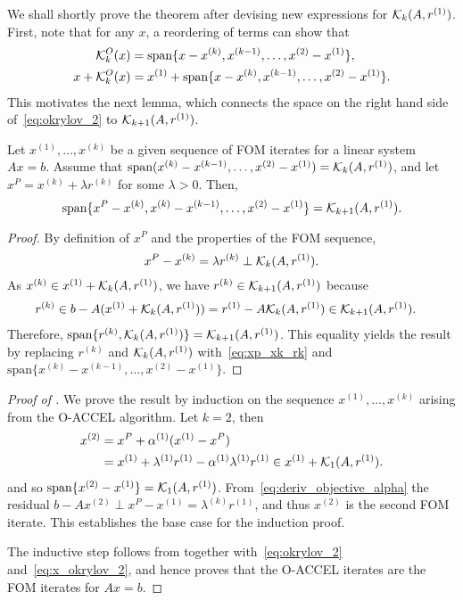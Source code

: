 \documentclass[main.tex]{subfiles}
\begin{document}
We shall shortly prove the theorem after devising new expressions for
$\mathcal{K}_{k}(A,r^{(1)})$.  First, note that for any $x$, a reordering of terms can
show that
\begin{align}\label{eq:okrylov_2}
  \mathcal{K}_{k}^O(x)
  &=
    \mbox{span}\{x-x^{(k)},x^{(k-1)},\dots,x^{(2)}-x^{(1)}\},\\
  x+\mathcal{K}_{k}^O(x)
  &= x^{(1)} +
    \mbox{span}\{x-x^{(k)},x^{(k-1)},\dots,x^{(2)}-x^{(1)}\}.
    \label{eq:x_okrylov_2}
\end{align}
This motivates the next lemma, which connects the space on the right
hand side of~\eqref{eq:okrylov_2} to $\mathcal{K}_{k+1}(A,r^{(1)})$.
\begin{lemma}\label{lem:fom_xp}
  Let $x^{(1)},\dots,x^{(k)}$ be a given sequence of FOM iterates for
  a linear system $Ax=b$.  Assume that
  $\mbox{span}(x^{(k)}-x^{(k-1)},\dots,x^{(2)}-x^{(1)})=\mathcal{K}_{k}(A,r^{(1)})$,
  and let $x^P = x^{(k)}+\lambda r^{(k)}$ for some $\lambda>0$.  Then,
  \begin{equation}
    \mbox{span}\{x^P-x^{(k)},x^{(k)}-x^{(k-1)},\dots,x^{(2)}-x^{(1)}\}
    = \mathcal{K}_{k+1}(A,r^{(1)}).
  \end{equation}
\end{lemma}
\begin{proof}
  By definition of $x^P$ and the properties of the FOM sequence,
  \begin{equation}\label{eq:xp_xk_rk}
    x^{P}-x^{(k)} = \lambda r^{(k)}\perp \mathcal{K}_{k}(A,r^{(1)}).
  \end{equation}
  As $x^{(k)}\in x^{(1)}+\mathcal{K}_{k}(A,r^{(1)})$, we have $r^{(k)}\in\mathcal{K}_{k+1}(A,r^{(1)})$
  because
  \begin{align}
    r^{(k)} &\in b - A(x^{(1)} +\mathcal{K}_{k}(A,r^{(1)}))
              = r^{(1)} - A\mathcal{K}_{k}(A,r^{(1)})
              \in \mathcal{K}_{k+1}(A,r^{(1)}).
  \end{align}
  Therefore, $\mbox{span}\{r^{(k)},\mathcal{K}_{k}(A,r^{(1)})\}=\mathcal{K}_{k+1}(A,r^{(1)})$.  This
  equality yields the result by replacing $r^{(k)}$ and $\mathcal{K}_{k}(A,r^{(1)})$
  with~\eqref{eq:xp_xk_rk} and
  $\mbox{span}\{x^{(k)}-x^{(k-1)},\dots,x^{(2)}-x^{(1)}\}$.
\end{proof}

\begin{proof}[Proof of ]
  We prove the result by induction on the sequence
  $x^{(1)},\dots,x^{(k)}$ arising from the O-ACCEL algorithm.  Let
  $k=2$, then
  \begin{align}
    x^{(2)}
    &= x^P + \alpha^{(1)}(x^{(1)}-x^P)\\
    &= x^{(1)} + \lambda^{(1)}r^{(1)} -
      \alpha^{(1)}\lambda^{(1)}r^{(1)}
      \in x^{(1)} + \mathcal{K}_{1}(A,r^{(1)}).
  \end{align}
  and so $\mbox{span}\{x^{(2)}-x^{(1)}\} = \mathcal{K}_{1}(A,r^{(1)})$.
  From~\eqref{eq:deriv_objective_alpha} the residual
  $b-Ax^{(2)}\perp x^P-x^{(1)} = \lambda^{(k)}r^{(1)}$, and thus
  $x^{(2)}$ is the second FOM iterate. This establishes the base case
  for the induction proof.

  The inductive step follows from  together
  with~\eqref{eq:okrylov_2} and~\eqref{eq:x_okrylov_2}, and hence
  proves that the O-ACCEL iterates are the FOM iterates for $Ax=b$.
\end{proof}
\end{document}
